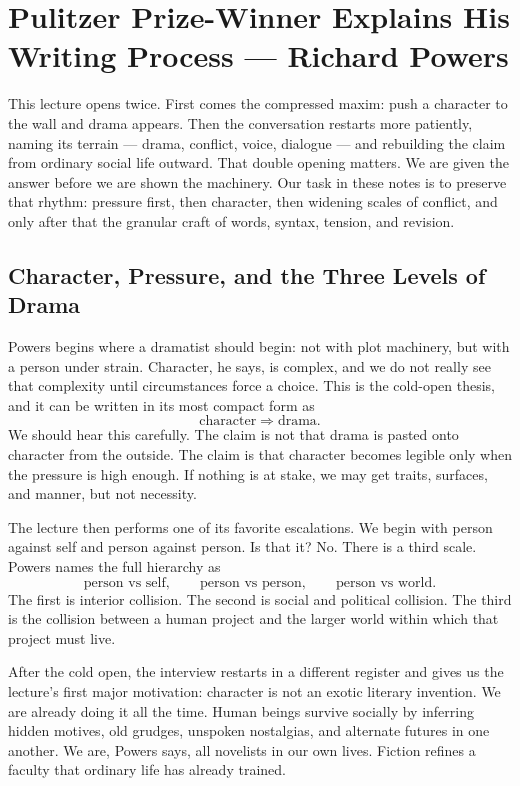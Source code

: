 \chapter{Pulitzer Prize-Winner Explains His Writing Process --- Richard Powers}

This lecture opens twice. First comes the compressed maxim: push a character to the wall and drama appears. Then the conversation restarts more patiently, naming its terrain --- drama, conflict, voice, dialogue --- and rebuilding the claim from ordinary social life outward. That double opening matters. We are given the answer before we are shown the machinery. Our task in these notes is to preserve that rhythm: pressure first, then character, then widening scales of conflict, and only after that the granular craft of words, syntax, tension, and revision.

\section{Character, Pressure, and the Three Levels of Drama}

Powers begins where a dramatist should begin: not with plot machinery, but with a person under strain. Character, he says, is complex, and we do not really see that complexity until circumstances force a choice. This is the cold-open thesis, and it can be written in its most compact form as
\begin{equation}
\text{character} \Rightarrow \text{drama}.
\end{equation}
We should hear this carefully. The claim is not that drama is pasted onto character from the outside. The claim is that character becomes legible only when the pressure is high enough. If nothing is at stake, we may get traits, surfaces, and manner, but not necessity.

The lecture then performs one of its favorite escalations. We begin with person against self and person against person. Is that it? No. There is a third scale. Powers names the full hierarchy as
\begin{equation}
\text{person vs self},\qquad \text{person vs person},\qquad \text{person vs world}.
\end{equation}
The first is interior collision. The second is social and political collision. The third is the collision between a human project and the larger world within which that project must live.

After the cold open, the interview restarts in a different register and gives us the lecture's first major motivation: character is not an exotic literary invention. We are already doing it all the time. Human beings survive socially by inferring hidden motives, old grudges, unspoken nostalgias, and alternate futures in one another. We are, Powers says, all novelists in our own lives. Fiction refines a faculty that ordinary life has already trained.

